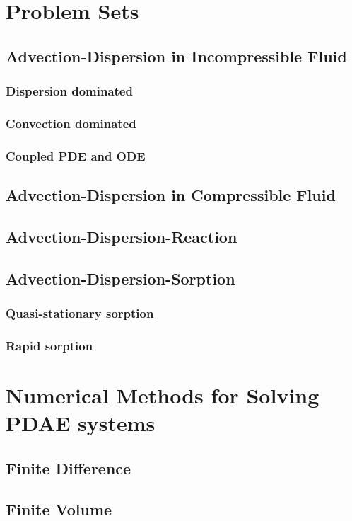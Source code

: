 \documentclass{article}
\begin{document}
\section{Problem Sets}
\subsection{Advection-Dispersion in Incompressible Fluid}
\subsubsection{Dispersion dominated}
\subsubsection{Convection dominated}
\subsubsection{Coupled PDE and ODE}
\subsection{Advection-Dispersion in Compressible Fluid}

\subsection{Advection-Dispersion-Reaction}
\subsection{Advection-Dispersion-Sorption}
\subsubsection{Quasi-stationary sorption}
\subsubsection{Rapid sorption}

\section{Numerical Methods for Solving PDAE systems}

\subsection{Finite Difference}
\subsection{Finite Volume}
\end{document}
